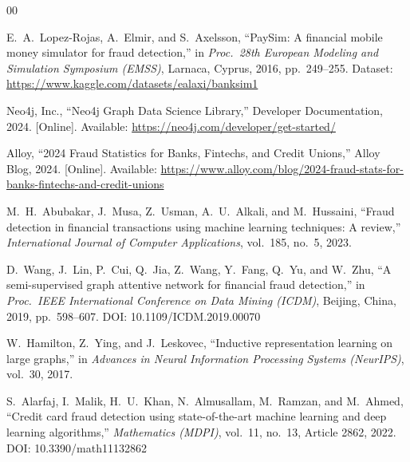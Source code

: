 \documentclass[conference]{IEEEtran}
\begin{document}
\balance
\begin{thebibliography}{00}

E.\ A.\ Lopez-Rojas, A.\ Elmir, and S.\ Axelsson, ``PaySim: A financial mobile money simulator for fraud detection,'' in \textit{Proc.\ 28th European Modeling and Simulation Symposium (EMSS)}, Larnaca, Cyprus, 2016, pp.\ 249--255. Dataset: \url{https://www.kaggle.com/datasets/ealaxi/banksim1}

Neo4j, Inc., ``Neo4j Graph Data Science Library,'' Developer Documentation, 2024. [Online]. Available: \url{https://neo4j.com/developer/get-started/}

Alloy, ``2024 Fraud Statistics for Banks, Fintechs, and Credit Unions,'' Alloy Blog, 2024. [Online]. Available: \url{https://www.alloy.com/blog/2024-fraud-stats-for-banks-fintechs-and-credit-unions}

M.\ H.\ Abubakar, J.\ Musa, Z.\ Usman, A.\ U.\ Alkali, and M.\ Hussaini, ``Fraud detection in financial transactions using machine learning techniques: A review,'' \textit{International Journal of Computer Applications}, vol.\ 185, no.\ 5, 2023.

D.\ Wang, J.\ Lin, P.\ Cui, Q.\ Jia, Z.\ Wang, Y.\ Fang, Q.\ Yu, and W.\ Zhu, ``A semi-supervised graph attentive network for financial fraud detection,'' in \textit{Proc.\ IEEE International Conference on Data Mining (ICDM)}, Beijing, China, 2019, pp.\ 598--607. DOI: 10.1109/ICDM.2019.00070

W.\ Hamilton, Z.\ Ying, and J.\ Leskovec, ``Inductive representation learning on large graphs,'' in \textit{Advances in Neural Information Processing Systems (NeurIPS)}, vol.\ 30, 2017.

S.\ Alarfaj, I.\ Malik, H.\ U.\ Khan, N.\ Almusallam, M.\ Ramzan, and M.\ Ahmed, ``Credit card fraud detection using state-of-the-art machine learning and deep learning algorithms,'' \textit{Mathematics (MDPI)}, vol.\ 11, no.\ 13, Article 2862, 2022. DOI: 10.3390/math11132862

\end{thebibliography}
\end{document}
